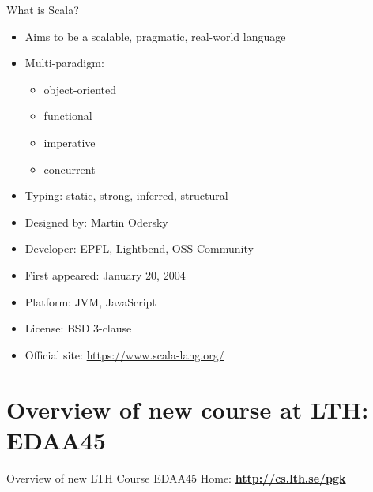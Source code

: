 \documentclass{lecturenotes}
\begin{document}
\begin{Slide}{What is Scala?}
\begin{itemize}
\item Aims to be a scalable, pragmatic, real-world language
\item Multi-paradigm:  
\begin{itemize}
\item object-oriented 
\item functional 
\item imperative 
\item concurrent
\end{itemize}
\item Typing: static, strong, inferred, structural

\item Designed by: Martin Odersky
\item Developer: EPFL, Lightbend, OSS Community
\item First appeared:  January 20, 2004
\item Platform: JVM, JavaScript
\item License: BSD 3-clause
\item Official site: \url{https://www.scala-lang.org/}
\end{itemize}


\end{Slide}


\section{Overview of new course at LTH: EDAA45}

\begin{Slide}{Overview of new LTH Course EDAA45}
Home: \textbf{\url{http://cs.lth.se/pgk}} \\ \vspace{1em}

\noindent\resizebox{0.8\columnwidth}{!}{\fontsize{8}{10}\selectfont

}
\end{Slide}
\end{document}
